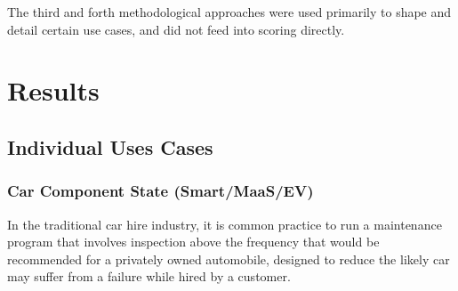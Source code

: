 \documentclass[journal]{IEEEtran}
\begin{document}
The third and forth methodological approaches were used primarily to shape and detail certain use cases, and did not feed into scoring directly. 

\section{Results}





\subsection{Individual Uses Cases}

\subsubsection{Car Component State (Smart/MaaS/EV)}

In the traditional car hire industry, it is common practice to run a
maintenance program that involves inspection above the frequency that
would be recommended for a privately owned automobile, designed to
reduce the likely car may suffer from a failure while hired by a
customer.
\end{document}
